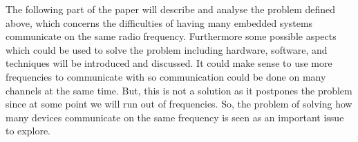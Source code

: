 \bigskip \noindent
The following part of the paper will describe and analyse the problem defined above, which concerns the difficulties of having many embedded systems communicate on the same radio frequency.
Furthermore some possible aspects which could be used to solve the problem including hardware, software, and techniques will be introduced and discussed.
It could make sense to use more frequencies to communicate with so communication could be done on many channels at the same time.
But, this is not a solution as it postpones the problem since at some point we will run out of frequencies. 
So, the problem of solving how many devices communicate on the same frequency is seen as an important issue to explore.

